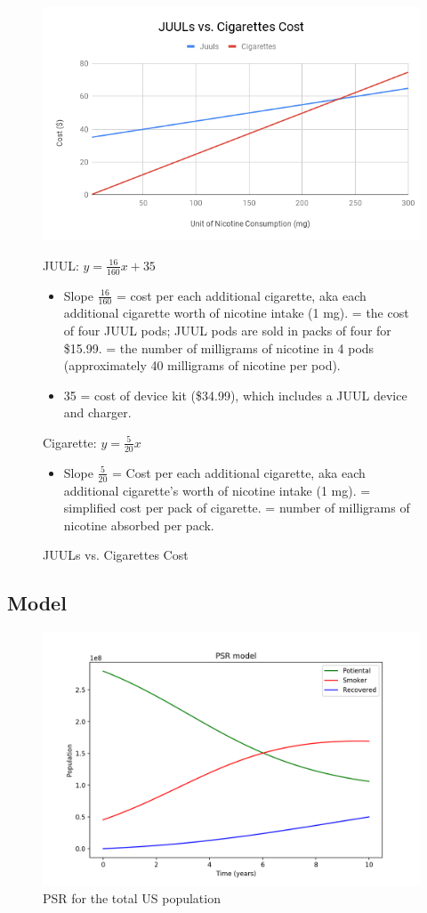 \documentclass[12pt,letterpaper]{article}
\begin{document}
\begin{figure}[H]
  \centering
  \includegraphics[width=.8\linewidth]{JUULs-vs-Cigarettes-Cost}
  \caption{JUULs vs. Cigarettes Cost}
  \label{fig:cigcosts}
  JUUL: $y = \frac{16}{160} x + 35$
  \begin{itemize}
  	\item Slope $\frac{16}{160}$ = cost per each additional cigarette, aka each additional cigarette worth of nicotine intake (1 mg).
  	   = the cost of four JUUL pods; JUUL pods are sold in packs of four for \$15.99.
  	   = the number of milligrams of nicotine in 4 pods (approximately 40 milligrams of nicotine per pod).
  	\item 35 = cost of device kit (\$34.99), which includes a JUUL device and charger.
  \end{itemize}
  Cigarette: $y = \frac{5}{20} x$
  \begin{itemize}
    \item Slope $\frac{5}{20}$ = Cost per each additional cigarette, aka each additional cigarette’s worth of nicotine intake (1 mg).
       = simplified cost per pack of cigarette.
       = number of milligrams of nicotine absorbed per pack.
  \end{itemize}
\end{figure}

\subsection{Model}

\begin{figure}[H]
  \centering
  \includegraphics[width=.8\linewidth]{PSR}
  \caption{PSR for the total US population}
  \label{fig:PSR}
\end{figure}
\end{document}
